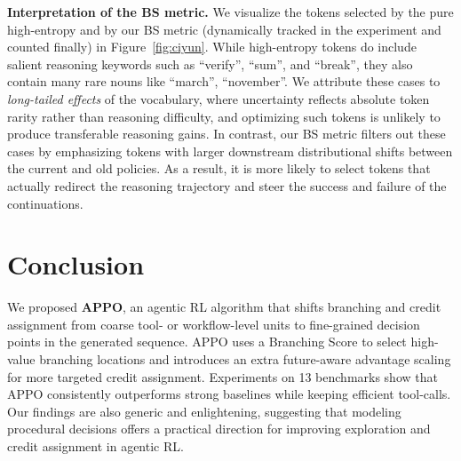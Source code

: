 \documentclass{llmxive}
\begin{document}
\noindent\textbf{Interpretation of the BS metric.} We visualize the tokens selected by the pure high-entropy and by our BS metric (dynamically tracked in the experiment and counted finally) in Figure~\ref{fig:ciyun}. While high-entropy tokens do include salient reasoning keywords such as ``verify'', ``sum'', and ``break'', they also contain many rare nouns like ``march'', ``november''. We attribute these cases to \textit{long-tailed effects} of the vocabulary, where uncertainty reflects absolute token rarity rather than reasoning difficulty, and optimizing such tokens is unlikely to produce transferable reasoning gains. In contrast, our BS metric filters out these cases by emphasizing tokens with larger downstream distributional shifts between the current and old policies. As a result, it is more likely to select tokens that actually redirect the reasoning trajectory and steer  the success and failure of the continuations.
 
\vspace{-0.1cm}
\section{Conclusion}

We proposed \textbf{APPO}, an agentic RL algorithm that shifts branching and credit assignment from coarse tool- or workflow-level units to fine-grained decision points in the generated sequence. APPO uses a Branching Score to select high-value branching locations and introduces an extra future-aware advantage scaling for more targeted credit assignment. Experiments on 13 benchmarks show that APPO consistently outperforms strong baselines while keeping efficient tool-calls. Our findings are also generic and enlightening, suggesting that modeling procedural decisions offers a practical direction for improving exploration and credit assignment in agentic RL.

{
    \small
    
    
}
 



 
\appendix
\end{document}

